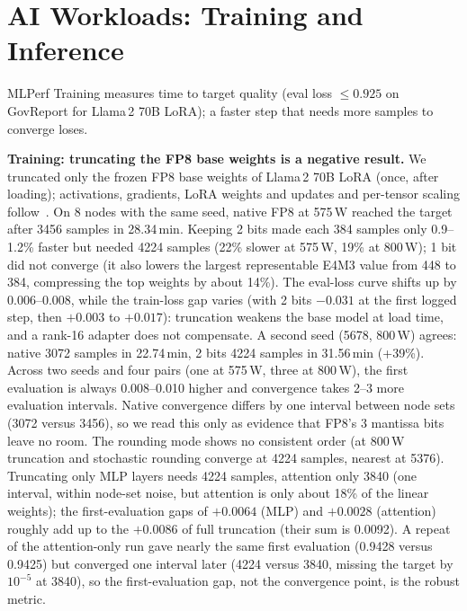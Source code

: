 \documentclass[conference]{IEEEtran}
\newcommand{\W}{\,W}
\newcommand{\pct}{\%}
\begin{document}
\section{AI Workloads: Training and Inference}\label{sec:ai}

MLPerf Training measures time to target quality (eval loss $\le0.925$ on GovReport for Llama\,2 70B LoRA); a faster
step that needs more samples to converge loses.

\textbf{Training: truncating the FP8 base weights is a negative result.} We truncated only the frozen FP8 base weights
of Llama\,2 70B LoRA (once, after loading); activations, gradients, LoRA weights and updates and per-tensor scaling
follow~\cite{Micikevicius2022}. On 8 nodes with the same seed, native FP8 at 575\W{} reached the target after 3456
samples in 28.34\,min. Keeping 2 bits made each 384 samples only 0.9--1.2\pct{} faster but needed 4224 samples (22\pct{}
slower at 575\W, 19\pct{} at 800\W); 1 bit did not converge (it also lowers the largest representable E4M3 value
from 448 to 384, compressing the top weights by about 14\pct). The eval-loss curve shifts up by 0.006--0.008, while
the train-loss gap varies (with 2 bits $-0.031$ at the first logged step, then $+0.003$ to $+0.017$): truncation
weakens the base model at load time, and a rank-16 adapter does not compensate. A second seed (5678, 800\W) agrees: native 3072 samples in 22.74\,min,
2 bits 4224 samples in 31.56\,min (+39\pct). Across two seeds and four pairs (one at 575\W, three at 800\W), the first evaluation is always
0.008--0.010 higher and convergence takes 2--3 more evaluation intervals. Native convergence differs by one interval
between node sets (3072 versus 3456), so we read this only as evidence that FP8's 3 mantissa bits leave no room. The
rounding mode shows no consistent order (at 800\W{} truncation and stochastic rounding converge at 4224 samples,
nearest at 5376). Truncating only MLP layers needs 4224 samples, attention only 3840 (one interval, within node-set
noise, but attention is only about 18\pct{} of the linear weights); the first-evaluation gaps of $+0.0064$ (MLP) and
$+0.0028$ (attention) roughly add up to the $+0.0086$ of full truncation (their sum is 0.0092). A repeat of the
attention-only run gave nearly the
same first evaluation (0.9428 versus 0.9425) but converged one interval later (4224 versus 3840, missing the target by
$10^{-5}$ at 3840), so the first-evaluation gap, not the convergence point, is the robust metric.
\end{document}
